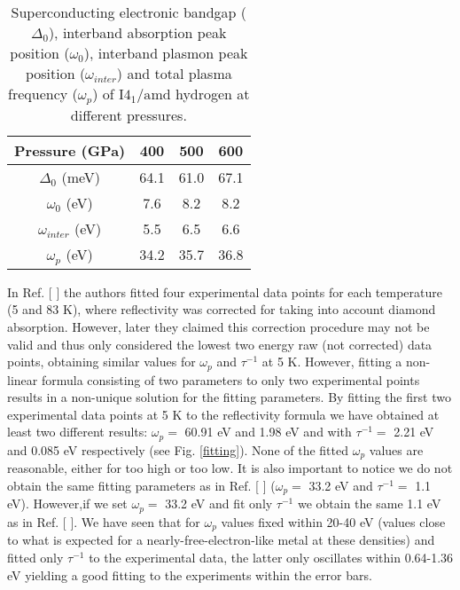 \documentclass[11pt,titlepage,a4paper,twoside]{article}
\newcommand{\onlinecite}[1]{\hspace{-1 ex} \nocite{#1}\citenum{#1}}
\begin{document}
\begin{table}[t]
\begin{tabular}{cccc}
\hline
\hline
Pressure (GPa)    &        400  &    500   &  600 \\
\hline
$\Delta_0$ (meV)  &       64.1  &   61.0   & 67.1 \\
$\omega_0$ (eV)   &        7.6  &    8.2   &  8.2 \\
$\omega_{inter}$ (eV)& 5.5  &    6.5   &  6.6 \\
$\omega_p$  (eV)   &       34.2  &   35.7   & 36.8 \\
\hline
\hline
\end{tabular}
\caption{Superconducting electronic bandgap ($\Delta_0$), interband absorption peak position ($\omega_0$), interband plasmon peak position ($\omega_{inter}$) and total plasma frequency ($\omega_p$) of $\mathrm{I4_1/amd}$ hydrogen at different pressures.
\label{changes}}
\end{table}

In Ref. [\onlinecite{Diaseaal1579}] the authors fitted four experimental data points for each temperature (5 and 83 K), where reflectivity was corrected for taking into account diamond absorption. However, later they claimed this correction procedure
may not be valid and thus only considered the lowest two energy raw (not corrected) data points\cite{Dias2017}, obtaining similar values for $\omega_p$ and $\tau^{-1}$ at 5 K. However, fitting a non-linear formula consisting of two parameters
to only two experimental points results in a non-unique solution for the fitting parameters. By fitting the first two experimental data points at 5 K to the reflectivity formula we have obtained at least two different results: $\omega_p=$ 
60.91 eV and 1.98 eV and with $\tau^{-1}=$ 2.21 eV and 0.085 eV respectively (see Fig. \ref{fitting}). None of the fitted $\omega_p$ values are reasonable, either for too high or too low. 
It is also important to notice we do not obtain the same fitting parameters as in Ref. [\onlinecite{Dias2017}] ($\omega_p=$ 33.2 eV and $\tau^{-1}=$ 1.1 eV). However,if we set $\omega_p=$ 33.2 eV and fit only $\tau^{-1}$ we obtain the same 1.1 eV as 
in Ref. [\onlinecite{Dias2017}].
We have seen that for $\omega_p$ values fixed within 20-40 eV (values close to what is expected for a nearly-free-electron-like metal at these densities) and fitted only $\tau^{-1}$ to the
experimental data, the latter only oscillates within 0.64-1.36 eV yielding a good fitting to the experiments within the error bars.   
\end{document}
